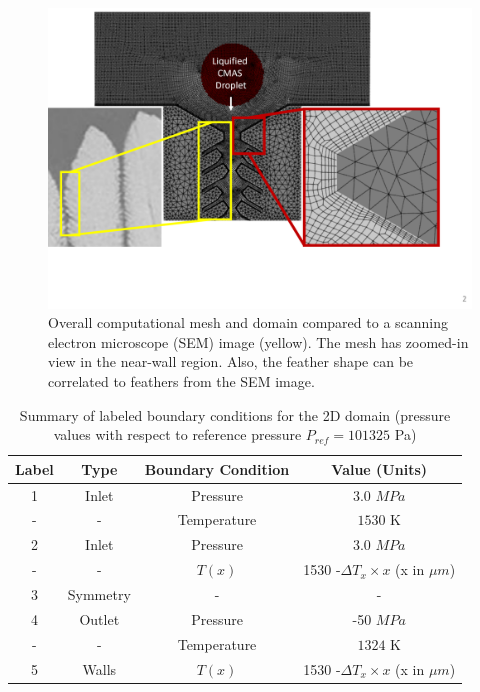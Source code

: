 \documentclass[%
 aip,
 amsmath,amssymb,
 reprint,%
floatfix]{revtex4-1}
\begin{document}
\begin{figure}
\centering
\includegraphics[width=\linewidth]{Figures/mesh_and_sem_compare.png}
\caption{Overall computational mesh and domain compared to a scanning electron microscope (SEM) image (yellow). The mesh has zoomed-in view in the near-wall region. Also, the feather shape can be correlated to feathers from the SEM image.}
\label{fig:mesh}
\end{figure}



\begin{table}
\caption{\label{tab:2DboundaryConditions} Summary of labeled boundary conditions for the 2D domain (pressure values with respect to reference pressure $P_{ref} = 101325$ Pa)}
\centering
\begin{ruledtabular}
\begin{tabular}{cccc}
Label &Type& Boundary Condition& Value (Units)\\\hline
1& Inlet&Pressure & 3.0 $MPa$\\
-& -&Temperature& $1530$ K\\
2& Inlet&Pressure& 3.0  $MPa$\\
-& -&$T(x)$& 1530 -$\Delta T_{x}\times x$ (x in $\mu m$)\\
3& Symmetry&- & -\\
4& Outlet&Pressure& -50 $MPa$\\
-& -&Temperature & $1324$ K \\
5& Walls&$T(x)$& 1530 -$\Delta T_{x}\times x$ (x in $\mu m$)\\
\end{tabular}
\end{ruledtabular}
\end{table}
\end{document}
